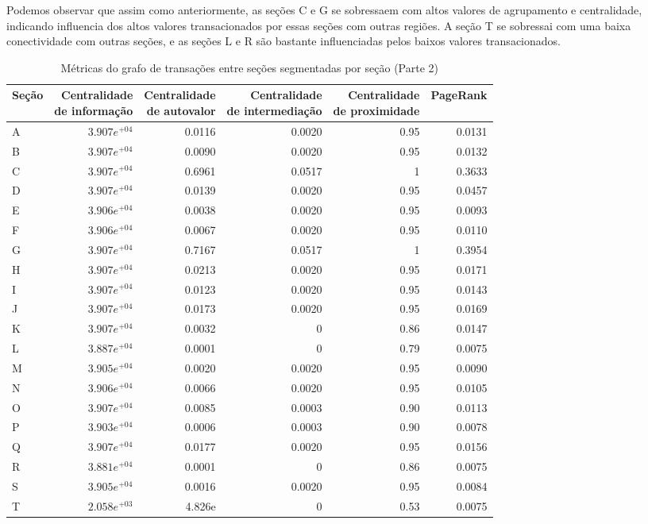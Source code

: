 Podemos observar que assim como anteriormente, as seções C e G se sobressaem com altos valores de agrupamento e centralidade, indicando influencia dos altos valores transacionados por essas seções com outras regiões. A seção T se sobressai com uma baixa conectividade com outras seções, e as seções L e R são bastante influenciadas pelos baixos valores transacionados.

\begin{table}[htb]
\centering
\caption{Métricas do grafo de transações entre seções segmentadas por seção (Parte 2)}
\label{tab:metricas-redes:grafo-por-secao-especificas2}
    \begin{tabular}{l|rrrrr}
    \toprule
    Seção & \shortstack{Centralidade\\de informação} &  \shortstack{Centralidade\\de autovalor} &   \shortstack{Centralidade\\de intermediação} & \shortstack{Centralidade\\de proximidade} & PageRank \\
    \midrule
    A & $3.907e^{+04}$ &  0.0116 &  0.0020 &  0.95 &  0.0131 \\
    B & $3.907e^{+04}$ &  0.0090 &  0.0020 &  0.95 &  0.0132 \\
    C & $3.907e^{+04}$ &  0.6961 &  0.0517 &  1    &  0.3633 \\
    D & $3.907e^{+04}$ &  0.0139 &  0.0020 &  0.95 &  0.0457 \\
    E & $3.906e^{+04}$ &  0.0038 &  0.0020 &  0.95 &  0.0093 \\
    F & $3.906e^{+04}$ &  0.0067 &  0.0020 &  0.95 &  0.0110 \\
    G & $3.907e^{+04}$ &  0.7167 &  0.0517 &  1    &  0.3954 \\
    H & $3.907e^{+04}$ &  0.0213 &  0.0020 &  0.95 &  0.0171 \\
    I & $3.907e^{+04}$ &  0.0123 &  0.0020 &  0.95 &  0.0143 \\
    J & $3.907e^{+04}$ &  0.0173 &  0.0020 &  0.95 &  0.0169 \\
    K & $3.907e^{+04}$ &  0.0032 &  0      &  0.86 &  0.0147 \\
    L & $3.887e^{+04}$ &  0.0001 &  0      &  0.79 &  0.0075 \\
    M & $3.905e^{+04}$ &  0.0020 &  0.0020 &  0.95 &  0.0090 \\
    N & $3.906e^{+04}$ &  0.0066 &  0.0020 &  0.95 &  0.0105 \\
    O & $3.907e^{+04}$ &  0.0085 &  0.0003 &  0.90 &  0.0113 \\
    P & $3.903e^{+04}$ &  0.0006 &  0.0003 &  0.90 &  0.0078 \\
    Q & $3.907e^{+04}$ &  0.0177 &  0.0020 &  0.95 &  0.0156 \\
    R & $3.881e^{+04}$ &  0.0001 &  0      &  0.86 &  0.0075 \\
    S & $3.905e^{+04}$ &  0.0016 &  0.0020 &  0.95 &  0.0084 \\
    T & $2.058e^{+03}$ &  4.826e &  0      &  0.53 &  0.0075 \\
    \bottomrule
    \end{tabular}
\fdadospesquisa
\end{table}

